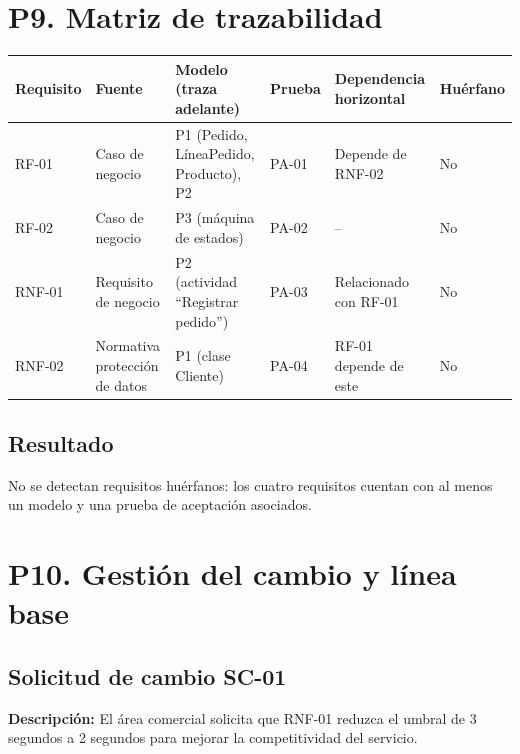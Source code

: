 \documentclass[12pt,a4paper]{article}
\begin{document}
\section{P9. Matriz de trazabilidad}

\begin{longtable}{p{2cm}p{3cm}p{4cm}p{2.5cm}p{3cm}p{1.5cm}}
\toprule
\textbf{Requisito} &
\textbf{Fuente} &
\textbf{Modelo (traza adelante)} &
\textbf{Prueba} &
\textbf{Dependencia horizontal} &
\textbf{Huérfano} \\
\midrule

RF-01 &
Caso de negocio &
P1 (Pedido, LíneaPedido, Producto), P2 &
PA-01 &
Depende de RNF-02 &
No \\

RF-02 &
Caso de negocio &
P3 (máquina de estados) &
PA-02 &
-- &
No \\

RNF-01 &
Requisito de negocio &
P2 (actividad ``Registrar pedido'') &
PA-03 &
Relacionado con RF-01 &
No \\

RNF-02 &
Normativa protección de datos &
P1 (clase Cliente) &
PA-04 &
RF-01 depende de este &
No \\

\bottomrule
\end{longtable}

\subsection*{Resultado}

No se detectan requisitos huérfanos: los cuatro requisitos cuentan con al menos un modelo y una prueba de aceptación asociados.


\section{P10. Gestión del cambio y línea base}

\subsection{Solicitud de cambio SC-01}

\textbf{Descripción:} El área comercial solicita que RNF-01 reduzca el umbral de 3 segundos a 2 segundos para mejorar la competitividad del servicio.

\medskip
\end{document}
